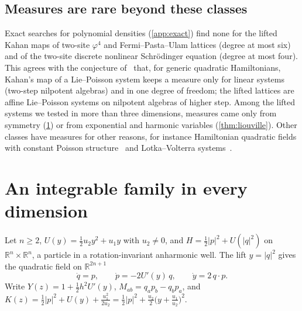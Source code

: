 \documentclass[11pt,a4paper]{article}
\theoremstyle{definition}
\theoremstyle{remark}
\newcommand{\R}{\mathbb{R}}
\begin{document}
\subsection{Measures are rare beyond these classes}

Exact searches for polynomial densities (\cref{app:exact}) find none for the lifted Kahan maps of two-site
$\varphi^4$ and Fermi--Pasta--Ulam lattices (degree at most six) and of the two-site discrete nonlinear
Schr\"odinger equation (degree at most four). This agrees with the conjecture of~\cite{LP} that, for generic
quadratic Hamiltonians, Kahan's map of a Lie--Poisson system keeps a measure only for linear systems (two-step
nilpotent algebras) and in one degree of freedom; the lifted lattices are affine Lie--Poisson systems on
nilpotent algebras of higher step. Among the lifted systems we tested in more than three dimensions, measures
came only from symmetry (\cref{sec:isotropic}) or from exponential and harmonic variables
(\cref{thm:liouville}). Other classes have measures for other reasons, for instance Hamiltonian quadratic fields
with constant Poisson structure~\cite{CMOQ13} and Lotka--Volterra systems~\cite{KQV16,vdKMMQ24}.

\section{An integrable family in every dimension}\label{sec:isotropic}

Let $n\ge2$, $U(y)=\frac12u_2y^2+u_1y$ with $u_2\ne0$, and
$H=\frac12\lvert p\rvert^2+U(\lvert q\rvert^2)$ on $\R^n\times\R^n$, a particle in a rotation-invariant
anharmonic well. The lift $y=\lvert q\rvert^2$ gives the quadratic field on $\R^{2n+1}$
\begin{equation}\label{eq:isofield}
\dot q=p,\qquad\dot p=-2U'(y)\,q,\qquad\dot y=2\,q\cdot p .
\end{equation}
Write $Y(z)=1+\frac12h^2U'(y)$, $M_{ab}=q_ap_b-q_bp_a$, and
$K(z)=\frac12\lvert p\rvert^2+U(y)+\frac{u_1^2}{2u_2}=\frac12\lvert p\rvert^2+\frac{u_2}2\big(y+\frac{u_1}{u_2}\big)^2$.
\end{document}
